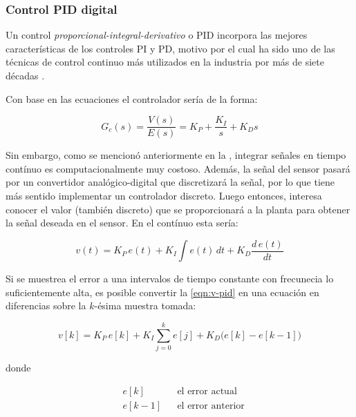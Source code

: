 %
%


\subsubsection{Control PID digital}%
\label{sec:control-pid}
Un control \emph{proporcional-integral-derivativo} o PID incorpora las mejores características de los controles PI y PD, motivo por el cual ha sido uno de las técnicas de control continuo más utilizados en la industria por más de siete décadas \citep{Hernandez2010,Odwyer2009,Ogata2003}.

Con base en las ecuaciones  el controlador sería de la forma:

\begin{equation}
G_{c}(s) = \frac{V(s)}{E(s)} =
	K_{P} + \frac{K_I}{s} + K_{D}s
\end{equation}

Sin embargo, como se mencionó anteriormente en la , integrar señales en tiempo contínuo es computacionalmente muy costoso.
Además, la señal del sensor pasará por un convertidor analógico-digital que discretizará la señal, por lo que tiene más sentido implementar un controlador discreto.
Luego entonces, interesa conocer el valor (también discreto) que se proporcionará a la planta para obtener la señal deseada en el sensor.
En el contínuo esta sería:

\begin{equation*}
v(t) = K_{P}\,e(t) + {K_I}\int e(t)\,dt+ K_{D}\frac{d\,e(t)}{dt}
\label{eqn:v-pid}
\end{equation*}

Si se muestrea el error a una intervalos de tiempo constante con frecunecia lo suficientemente alta, es posible convertir la \cref{eqn:v-pid} en una ecuación en diferencias sobre la $k$-ésima muestra tomada:

\begin{equation*}
v[k] =
		K_{P}\,e[k] +
		K_{I}\sum^{k}_{j=0} e[j]+
		K_{D}\big(e[k] - e[k-1]\big)
\end{equation*}

\noindent donde

\begin{align*}
	&e[k]                     && \text{el error actual}\\
	&e[k-1]                   && \text{el error anterior}
\end{align*}


